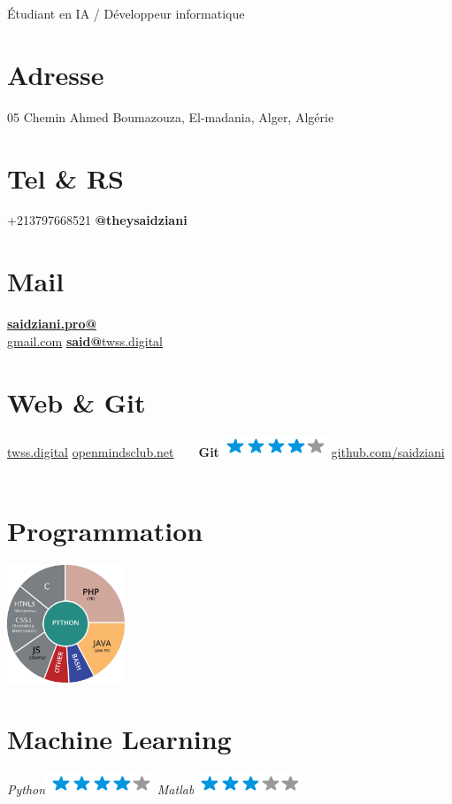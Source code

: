 \documentclass[]{friggeri-cv}
\begin{document}
      {Étudiant en IA / Développeur informatique}
      

\begin{aside}
  \section{Adresse}
    05 Chemin Ahmed Boumazouza,
    El-madania, Alger, Algérie
    ~
    ~
  \section{Tel \& RS}
    +213797668521
    {\textbf{@theysaidziani}}
    ~
    ~
  \section{Mail}
    \href{mailto:saidziani.pro@gmail.com}{\textbf{saidziani.pro@}\\gmail.com}
    \href{mailto:said@twss.digital}{\textbf{said@}twss.digital}
    ~
    ~
  \section{Web \& Git}
    \href{http://www.twss.digital}{twss.digital}
    \href{http://www.openmindsclub.net}{openmindsclub.net}
    ~
    ~
    \textbf{Git}\includegraphics[scale=0.40]{img/4stars.png}
    \href{https://github.com/saidziani}{github.com/saidziani}
    ~
    ~
  \section{Programmation}
    \includegraphics[width=100pt]{img/programmation.jpg}
    ~
    ~
  \section{Machine Learning}
    \emph{Python}\includegraphics[scale=0.40]{img/4stars.png}
    \emph{Matlab}\includegraphics[scale=0.40]{img/3stars.png}
    ~

\end{aside}
\end{document}
